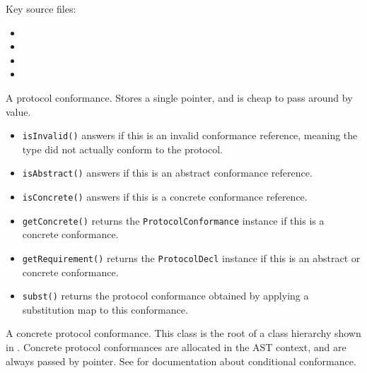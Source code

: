 \documentclass[../generics]{subfiles}
\begin{document}
Key source files:
\begin{itemize}
\item {}
\item {}
\item {}
\item {}
\end{itemize}

A protocol conformance. Stores a single pointer, and is cheap to pass around by value.
\begin{itemize}
\item \texttt{isInvalid()} answers if this is an invalid conformance reference, meaning the type did not actually conform to the protocol.
\item \texttt{isAbstract()} answers if this is an abstract conformance reference.
\item \texttt{isConcrete()} answers if this is a concrete conformance reference.
\item \texttt{getConcrete()} returns the \texttt{ProtocolConformance} instance if this is a concrete conformance.
\item \texttt{getRequirement()} returns the \texttt{ProtocolDecl} instance if this is an abstract or concrete conformance.
\item \texttt{subst()} returns the protocol conformance obtained by applying a substitution map to this conformance.
\end{itemize}

A concrete protocol conformance. This class is the root of a class hierarchy shown in . Concrete protocol conformances are allocated in the AST context, and are always passed by pointer. See  for documentation about conditional conformance.

\begin{figure}\label{conformancehierarchy}
\begin{center}
\end{center}
\end{figure}
\end{document}
